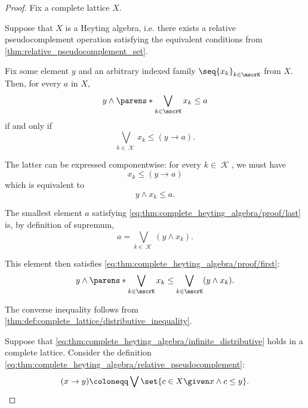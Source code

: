\begin{proof}
  Fix a complete lattice \( X \).

  \SufficiencySubProof Suppose that \( X \) is a Heyting algebra, i.e. there exists a relative pseudocomplement operation satisfying the equivalent conditions from \cref{thm:relative_pseudocomplement_set}.

  Fix some element \( y \) and an arbitrary indexed family \( \seq{ x_k }_{k \in \mscrK} \) from \( X \). Then, for every \( a \) in \( X \),
  \begin{equation}\label{eq:thm:complete_heyting_algebra/proof/first}
    y \wedge \parens*{ \bigvee_{k \in \mscrK} x_k } \leq a
  \end{equation}
  if and only if
  \begin{equation*}
    \bigvee_{k \in \mscrK} x_k \leq (y \rightarrow a).
  \end{equation*}

  The latter can be expressed componentwise: for every \( k \in \mscrK \), we must have
  \begin{equation*}
    x_k \leq (y \rightarrow a)
  \end{equation*}
  which is equivalent to
  \begin{equation}\label{eq:thm:complete_heyting_algebra/proof/last}
    y \wedge x_k \leq a.
  \end{equation}

  The smallest element \( a \) satisfying \eqref{eq:thm:complete_heyting_algebra/proof/last} is, by definition of supremum,
  \begin{equation*}
    a = \bigvee_{k \in \mscrK} (y \wedge x_k).
  \end{equation*}

  This element then satisfies \eqref{eq:thm:complete_heyting_algebra/proof/first}:
  \begin{equation*}
    y \wedge \parens*{ \bigvee_{k \in \mscrK} x_k } \leq \bigvee_{k \in \mscrK} (y \wedge x_k).
  \end{equation*}

  The converse inequality follows from \cref{thm:def:complete_lattice/distributive_inequality}.

  \NecessitySubProof Suppose that \eqref{eq:thm:complete_heyting_algebra/infinite_distributive} holds in a complete lattice. Consider the definition \eqref{eq:thm:complete_heyting_algebra/relative_pseudocomplement}:
  \begin{equation*}
    (x \rightarrow y) \coloneqq \bigvee\set{ c \in X \given x \wedge c \leq y }.
  \end{equation*}


\end{proof}
